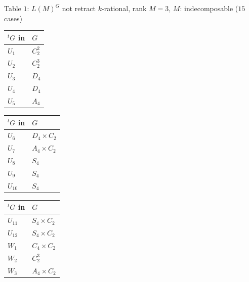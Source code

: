 \documentclass{amsart}
\theoremstyle{plain}
\theoremstyle{definition}
\theoremstyle{remark}
\begin{document}
%
\vspace*{2mm}
\begin{center}
Table $1$: $L(M)^G$ not retract $k$-rational, 
rank $M=3$, $M$: indecomposable ($15$ cases)\vspace*{2mm}\\
\fontsize{9pt}{11pt}\selectfont
\begin{tabular}{ll} 
${}^tG$ in \cite{Kun90} & %
$G$ \\\hline
$U_1$ %
& $C_2^2$\\
$U_2$ %
& $C_2^3$\\
$U_3$ %
& $D_4$\\
$U_4$ %
& $D_4$\\
$U_5$ %
& $A_4$
\end{tabular}\quad
\begin{tabular}{ll}
${}^tG$ in \cite{Kun90} & %
$G$ \\\hline
$U_6$ %
& $D_4\times C_2$\\
$U_7$ %
& $A_4\times C_2$\\
$U_8$ %
& $S_4$\\
$U_9$ %
& $S_4$\\
$U_{10}$ %
& $S_4$
\end{tabular}\quad
\begin{tabular}{ll} 
${}^tG$ in \cite{Kun90} & %
$G$ \\\hline
$U_{11}$ %
& $S_4\times C_2$\\
$U_{12}$ %
& $S_4\times C_2$\\
$W_1$ %
& $C_4\times C_2$\\
$W_2$ %
& $C_2^3$\\
$W_3$ %
& $A_4\times C_2$
\end{tabular}
\end{center}
%
\end{document}
